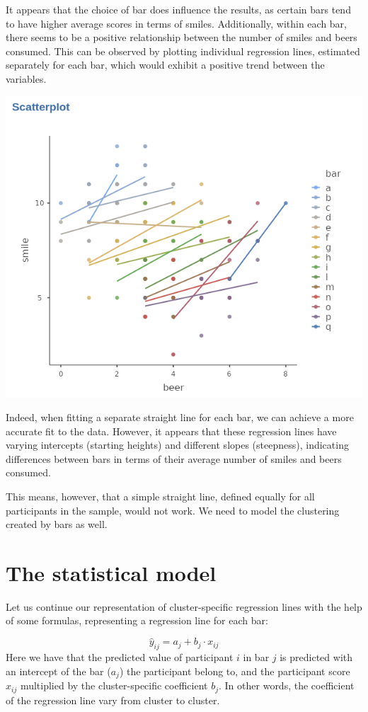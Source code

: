 \documentclass[
]{book}
\begin{document}
It appears that the choice of bar does influence the results, as certain bars tend to have higher average scores in terms of smiles. Additionally, within each bar, there seems to be a positive relationship between the number of smiles and beers consumed. This can be observed by plotting individual regression lines, estimated separately for each bar, which would exhibit a positive trend between the variables.

\includegraphics[width=0.8\linewidth]{bookletpics/4_theory_plot3}

Indeed, when fitting a separate straight line for each bar, we can achieve a more accurate fit to the data. However, it appears that these regression lines have varying intercepts (starting heights) and different slopes (steepness), indicating differences between bars in terms of their average number of smiles and beers consumed.

This means, however, that a simple straight line, defined equally for all participants in the sample, would not work. We need to model the clustering created by bars as well.

\hypertarget{the-statistical-model}{%
\section{The statistical model}\label{the-statistical-model}}

Let us continue our representation of cluster-specific regression lines with the help of some formulas, representing a regression line for each bar:

\[ 
\hat{y}_{ij}=a_j+ b_j \cdot x_{ij}
\]
Here we have that the predicted value of participant \(i\) in bar \(j\) is predicted with an intercept of the bar (\(a_j\)) the participant belong to, and the participant score \(x_{ij}\) multiplied by the cluster-specific coefficient \(b_{j}\). In other words, the coefficient of the regression line vary from cluster to cluster.
\end{document}
